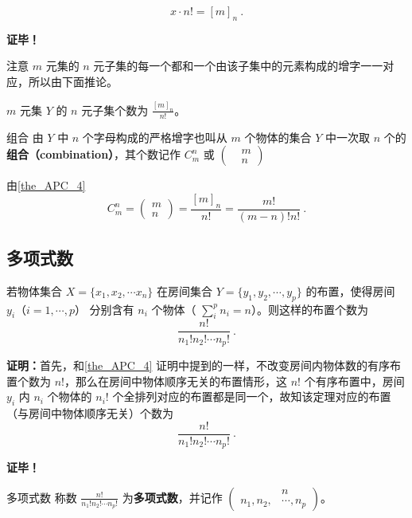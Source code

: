 \begin{equation}
x\cdot n!=[m]_n~.
\end{equation}

\textbf{证毕！}

注意 $m$ 元集的 $n$ 元子集的每一个都和一个由该子集中的元素构成的增字一一对应，所以由下面推论。
\begin{corollary}{}
$m$ 元集 $Y$ 的 $n$ 元子集个数为 $\frac{[m]_n}{n!}$。
\end{corollary}

\begin{definition}{组合}
由 $Y$ 中 $n$ 个字母构成的严格增字也叫从 $m$ 个物体的集合 $Y$ 中一次取 $n$ 个的\textbf{组合（combination）}，其个数记作 $C_m^n$ 或 $\left(\begin{aligned}&m\\&n\end{aligned}\right)$
\end{definition}
由\autoref{the_APC_4}
\begin{equation}\label{eq_APC_1}
C_m^n=\left(\begin{aligned}
m\\n
\end{aligned}\right)=\frac{[m]_n}{n!}=\frac{m!}{(m-n)!n!}~.
\end{equation}

\subsection{多项式数}
\begin{theorem}{}
若物体集合 $X=\{x_1,x_2,\cdots x_n\}$ 在房间集合 $Y=\{y_1,y_2,\cdots,y_p\}$ 的布置，使得房间 $y_i$（$i=1,\cdots,p$） 分别含有 $n_i$ 个物体（ $\sum_{i}^p n_i=n$）。则这样的布置个数为
\begin{equation}
\frac{n!}{n_1!n_2!\cdots n_p!}~.
\end{equation}
 
\end{theorem}
\textbf{证明：}首先，和\autoref{the_APC_4} 证明中提到的一样，不改变房间内物体数的有序布置个数为 $n!$，那么在房间中物体顺序无关的布置情形，这 $n!$ 个有序布置中，房间 $y_i$ 内 $n_i$ 个物体的 $n_i !$ 个全排列对应的布置都是同一个，故知该定理对应的布置（与房间中物体顺序无关）个数为
\begin{equation}
\frac{n!}{n_1!n_2!\cdots n_p!}~.
\end{equation}

\textbf{证毕！}

\begin{definition}{多项式数}
称数 $\frac{n!}{n_1!n_2!\cdots n_p!}$ 为\textbf{多项式数}，并记作 $\left(\begin{aligned}
&n\\n_1,n_2,&\cdots,n_p
\end{aligned}\right)$。
\end{definition}

